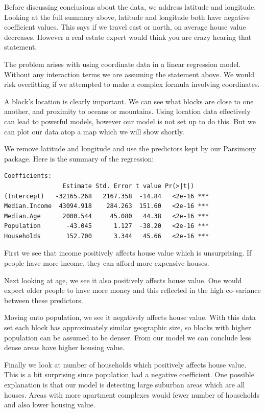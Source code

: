 \documentclass[letter]{article}
\begin{document}
Before discussing conclusions about the data, we address latitude and longitude. Looking at the full summary above, latitude and longitude both have negative coefficient values. This says if we travel east or north, on average house value decreases. However a real estate expert would think you are crazy hearing that statement.

The problem arises with using coordinate data in a linear regression model. Without any interaction terms we are assuming the statement above. We would risk overfitting if we attempted to make a complex formula involving coordinates. 

A block's location is clearly important. We can see what blocks are close to one another, and proximity to oceans or mountains. Using location data effectively can lead to powerful models, however our model is not set up to do this. But we can plot our data atop a map which we will show shortly.

We remove latitude and longitude and use the predictors kept by our Parsimony package. Here is the summary of the regression:
\begin{verbatim}
Coefficients:
                Estimate Std. Error t value Pr(>|t|)    
(Intercept)   -32165.268   2167.358  -14.84   <2e-16 ***
Median.Income  43094.918    284.263  151.60   <2e-16 ***
Median.Age      2000.544     45.080   44.38   <2e-16 ***
Population       -43.045      1.127  -38.20   <2e-16 ***
Households       152.700      3.344   45.66   <2e-16 ***
\end{verbatim}
First we see that income positively affects house value which is unsurprising. If people have more income, they can afford more expensive houses.

Next looking at age, we see it also positively affects house value. One would expect older people to have more money and this reflected in the high co-variance between these predictors.

Moving onto population, we see it negatively affects house value. With this data set each block has approximately similar geographic size, so blocks with higher population can be assumed to be denser. From our model we can conclude less dense areas have higher housing value. 

Finally we look at number of households which positively affects house value. This is a bit surprising since population had a negative coefficient. One possible explanation is that our model is detecting large suburban areas which are all houses. Areas with more apartment complexes would fewer number of households and also lower housing value.
\end{document}
